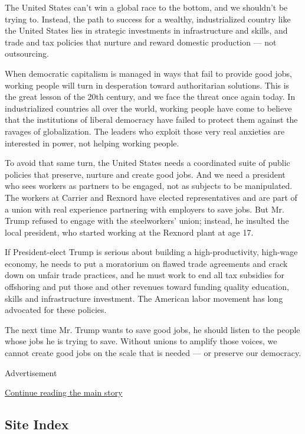The United States can't win a global race to the bottom, and we
shouldn't be trying to. Instead, the path to success for a wealthy,
industrialized country like the United States lies in strategic
investments in infrastructure and skills, and trade and tax policies
that nurture and reward domestic production --- not outsourcing.

When democratic capitalism is managed in ways that fail to provide good
jobs, working people will turn in desperation toward authoritarian
solutions. This is the great lesson of the 20th century, and we face the
threat once again today. In industrialized countries all over the world,
working people have come to believe that the institutions of liberal
democracy have failed to protect them against the ravages of
globalization. The leaders who exploit those very real anxieties are
interested in power, not helping working people.

To avoid that same turn, the United States needs a coordinated suite of
public policies that preserve, nurture and create good jobs. And we need
a president who sees workers as partners to be engaged, not as subjects
to be manipulated. The workers at Carrier and Rexnord have elected
representatives and are part of a union with real experience partnering
with employers to save jobs. But Mr. Trump refused to engage with the
steelworkers' union; instead, he insulted the local president, who
started working at the Rexnord plant at age 17.

If President-elect Trump is serious about building a high-productivity,
high-wage economy, he needs to put a moratorium on flawed trade
agreements and crack down on unfair trade practices, and he must work to
end all tax subsidies for offshoring and put those and other revenues
toward funding quality education, skills and infrastructure investment.
The American labor movement has long advocated for these policies.

The next time Mr. Trump wants to save good jobs, he should listen to the
people whose jobs he is trying to save. Without unions to amplify those
voices, we cannot create good jobs on the scale that is needed --- or
preserve our democracy.

Advertisement

\protect\hyperlink{after-bottom}{Continue reading the main story}

\hypertarget{site-index}{%
\subsection{Site Index}\label{site-index}}

